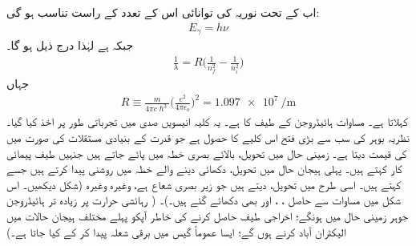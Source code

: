 اب  کے تحت نوریہ کی توانائی اس کے تعدد کے راست تناسب ہو گی:
\begin{align}
E_{\gamma}=h\nu
\end{align}
جبکہ   ہے لہٰذا درج ذیل ہو گا۔
\begin{align}\label{مساوات_تین_ابعادی_رڈبرگ_کلیہ}
\frac{1}{\lambda}=R\big(\frac{1}{n^{2}_{f}}-\frac{1}{n^{2}_{i}}\big)
\end{align}
جہاں 
\begin{align}
R\equiv \frac{m}{4\pi{c}\hslash^{3}}\big(\frac{e^{2}}{4\pi\epsilon_{o}}\big)^{2}=\SI{1.097e7}{\per\meter}
\end{align}
 کہلاتا ہے۔ مساوات  ہائیڈروجن کے طیف کا  ہے۔ یہ کلیہ انیسویں صدی میں تجرباتی طور پر اخذ کیا گیا۔نظریہ بوہر کی سب سے بڑی فتح اس کلیے کا حصول ہے جو قدرت کے بنیادی مستقلات کی صورت میں  کی قیمت دیتا ہے۔ زمینی حال  میں تحویل، بالائے بصری خطہ میں پائے جاتے ہیں جنہیں طیف پیمائی کار  کہتے ہیں۔ پہلی ہیجان حال 
میں تحویل، دکھائی دینے والے خطہ میں روشنی پیدا کرتے ہیں جسے  کہتے ہیں۔ اسی طرح  میں تحویل،  دیتے ہیں جو زیر بصری شعاع ہے، وغیرہ وغیرہ (شکل  دیکھیں۔ اس شکل میں  مساوات  سے حاصل  ، ، اور   بھی دکھائے گئے ہیں۔)۔ ( رہائشی حرارت پر زیادہ تر ہائیڈروجن جوہر زمینی حال میں ہونگے؛ اخراجی طیف حاصل کرنے کی خاطر آپکو پہلے مختلف ہیجان حالات میں الیکٹران آباد کرنے ہوں گے؛ ایسا عموماً گیس میں برقی شعلہ پیدا کر کے کیا جاتا ہے۔)


